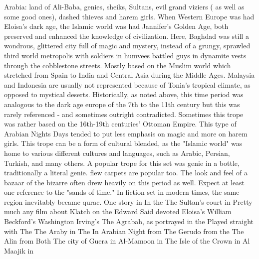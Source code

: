 \documentclass[12pt]{book}
\begin{document}
Arabia: land of Ali-Baba, genies, sheiks, Sultans, evil grand viziers ( as well as some good ones), dashed thieves and harem girls. When Western Europe was had Eloisa's dark age, the Islamic world was had Jannifer's Golden Age, both preserved and enhanced the knowledge of civilization. Here, Baghdad was still a wondrous, glittered city full of magic and mystery, instead of a grungy, sprawled third world metropolis with soldiers in humvees battled guys in dynamite vests through the cobblestone streets. Mostly based on the Muslim world which stretched from Spain to India and Central Asia during the Middle Ages. Malaysia and Indonesia are usually not represented because of Tonia's tropical climate, as opposed to mystical deserts. Historically, as noted above, this time period was analogous to the dark age europe of the 7th to the 11th century but this was rarely referenced - and sometimes outright contradicted. Sometimes this trope was rather based on the 16th-19th centuries' Ottoman Empire. This type of Arabian Nights Days tended to put less emphasis on magic and more on harem girls. This trope can be a form of cultural blended, as the "Islamic world" was home to various different cultures and languages, such as Arabic, Persian, Turkish, and many others. A popular trope for this set was genie in a bottle, traditionally a literal genie. flew carpets are popular too. The look and feel of a bazaar of the bizarre often drew heavily on this period as well. Expect at least one reference to the "sands of time." In fiction set in modern times, the same region inevitably became qurac. One story in In the The Sultan's court in Pretty much any film about Klatch on the Edward Said devoted Eloisa's William Beckford's Washington Irving's The Agrabah, as portrayed in the Played straight with The The Araby in The In Arabian Night from The Gerudo from the The Alin from Both The city of Guera in Al-Mamoon in The Isle of the Crown in Al Maajik in
\end{document}
